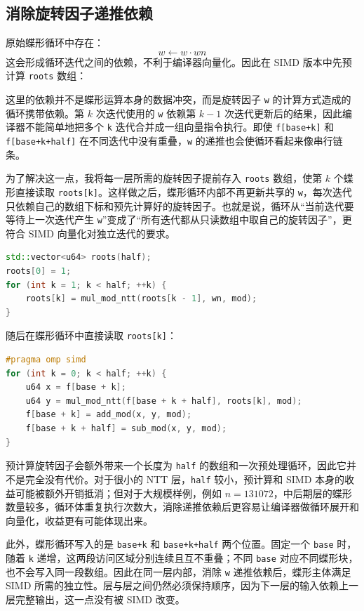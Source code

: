 \documentclass[a4paper]{article}
\begin{document}
\subsection{消除旋转因子递推依赖}

原始蝶形循环中存在：
\[
w\leftarrow w\cdot wn
\]
这会形成循环迭代之间的依赖，不利于编译器向量化。因此在 SIMD 版本中先预计算 \texttt{roots} 数组：

这里的依赖并不是蝶形运算本身的数据冲突，而是旋转因子 \texttt{w} 的计算方式造成的循环携带依赖。第 $k$ 次迭代使用的 \texttt{w} 依赖第 $k-1$ 次迭代更新后的结果，因此编译器不能简单地把多个 \texttt{k} 迭代合并成一组向量指令执行。即使 \texttt{f[base+k]} 和 \texttt{f[base+k+half]} 在不同迭代中没有重叠，\texttt{w} 的递推也会使循环看起来像串行链条。

为了解决这一点，我将每一层所需的旋转因子提前存入 \texttt{roots} 数组，使第 $k$ 个蝶形直接读取 \texttt{roots[k]}。这样做之后，蝶形循环内部不再更新共享的 \texttt{w}，每次迭代只依赖自己的数组下标和预先计算好的旋转因子。也就是说，循环从“当前迭代要等待上一次迭代产生 \texttt{w}”变成了“所有迭代都从只读数组中取自己的旋转因子”，更符合 SIMD 向量化对独立迭代的要求。

\begin{lstlisting}[title=预计算旋转因子,frame=trbl,language={C++}]
std::vector<u64> roots(half);
roots[0] = 1;
for (int k = 1; k < half; ++k) {
    roots[k] = mul_mod_ntt(roots[k - 1], wn, mod);
}
\end{lstlisting}

随后在蝶形循环中直接读取 \texttt{roots[k]}：

\begin{lstlisting}[title=OpenMP SIMD 蝶形循环,frame=trbl,language={C++}]
#pragma omp simd
for (int k = 0; k < half; ++k) {
    u64 x = f[base + k];
    u64 y = mul_mod_ntt(f[base + k + half], roots[k], mod);
    f[base + k] = add_mod(x, y, mod);
    f[base + k + half] = sub_mod(x, y, mod);
}
\end{lstlisting}

预计算旋转因子会额外带来一个长度为 \texttt{half} 的数组和一次预处理循环，因此它并不是完全没有代价。对于很小的 NTT 层，\texttt{half} 较小，预计算和 SIMD 本身的收益可能被额外开销抵消；但对于大规模样例，例如 $n=131072$，中后期层的蝶形数量较多，循环体重复执行次数大，消除递推依赖后更容易让编译器做循环展开和向量化，收益更有可能体现出来。

此外，蝶形循环写入的是 \texttt{base+k} 和 \texttt{base+k+half} 两个位置。固定一个 \texttt{base} 时，随着 \texttt{k} 递增，这两段访问区域分别连续且互不重叠；不同 \texttt{base} 对应不同蝶形块，也不会写入同一段数组。因此在同一层内部，消除 \texttt{w} 递推依赖后，蝶形主体满足 SIMD 所需的独立性。层与层之间仍然必须保持顺序，因为下一层的输入依赖上一层完整输出，这一点没有被 SIMD 改变。
\end{document}
